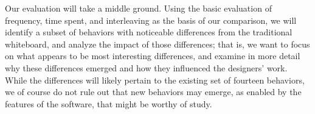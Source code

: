 Our evaluation will take a middle ground. Using the basic evaluation of frequency, time spent, and interleaving as the basis of our comparison, we will identify a subset of behaviors with noticeable differences from the traditional whiteboard, and analyze the impact of those differences; that is, we want to focus on what appears to be most interesting differences, and examine in more detail why these differences emerged and how they influenced the designers’ work. While the differences will likely pertain to the existing set of fourteen behaviors, we of course do not rule out that new behaviors may emerge, as enabled by the features of the software, that might be worthy of study. 



